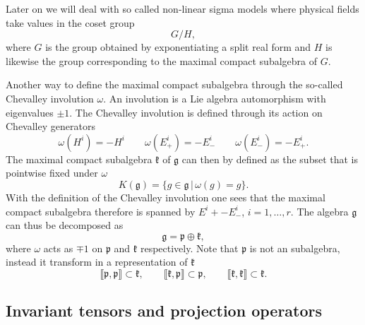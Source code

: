 Later on we will deal with so called non-linear sigma models where physical fields take values in the coset group
\begin{equation}
G/H,
\end{equation}
where $G$ is the group obtained by exponentiating a split real form and $H$ is likewise the group corresponding to the maximal compact subalgebra of $G$.

Another way to define the maximal compact subalgebra through the so-called Chevalley involution $\omega$. An involution is a Lie algebra automorphism with eigenvalues $\pm 1$. The Chevalley involution is defined through its action on Chevalley generators
\begin{equation}
    \omega(H^i) = -H^i\qquad \omega(E^i_+) = -E^i_- \qquad \omega(E^i_-) = -E^i_+.
\end{equation}
The maximal compact subalgebra $\mathfrak{k}$ of $\mathfrak{g}$ can then by defined as the subset that is pointwise fixed under $\omega$
\begin{equation}
    K(\mathfrak{g}) = \{g\in\mathfrak{g}\,|\, \omega (g) = g \}. 
\end{equation}
With the definition of the Chevalley involution one sees that the maximal compact subalgebra therefore is spanned by $E^i+-E^i_-$, $i=1,\ldots,r$. The algebra $\mathfrak{g}$ can thus be decomposed as 
\begin{equation}
    \mathfrak{g} = \mathfrak{p}\oplus\mathfrak{k},
\end{equation}
where $\omega$ acts as $\mp 1$ on $\mathfrak{p}$ and $\mathfrak{k}$ respectively. Note that $\mathfrak{p}$ is not an subalgebra, instead it transform in a representation of $\mathfrak{k}$ 
\begin{equation}
    \llbracket \mathfrak{p},\mathfrak{p}\rrbracket \subset \mathfrak{k},\qquad \llbracket \mathfrak{k},\mathfrak{p}\rrbracket\subset \mathfrak{p},\qquad \llbracket \mathfrak{k},\mathfrak{k}\rrbracket \subset \mathfrak{k}.
\end{equation}


\subsection{Invariant tensors and projection operators}



